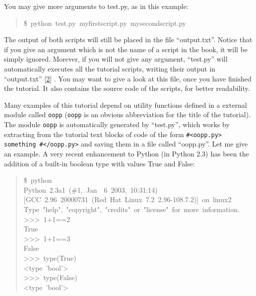\documentclass[10pt,english]{article}
\begin{document}
You may give more arguments to test.py, as in this example:
\begin{quote}
\begin{ttfamily}\begin{flushleft}
\mbox{{\$}~python~test.py~myfirstscript.py~mysecondscript.py}
\end{flushleft}\end{ttfamily}
\end{quote}

The output of both scripts will still be placed in the file ``output.txt''.
Notice that if you give an argument which is not the name of a script in the
book, it will be simply ignored. Morever, if you will not give any argument,
``test.py'' will automatically executes all the tutorial scripts, writing their 
output in ``output.txt'' [\hyperlink{id4}{2}] . You may want to give a look at this file, once 
you have finished the tutorial. It also contains the source code of 
the scripts, for better readability.

Many examples of this tutorial depend on utility functions defined
in a external module called \texttt{oopp} (\texttt{oopp} is an obvious abbreviation 
for the title of the tutorial). The module \texttt{oopp} is automatically generated 
by ``test.py'', which works by extracting from the tutorial 
text blocks of code of the form \texttt{{\#}<oopp.py> something {\#}</oopp.py>} 
and saving them in a file called ``oopp.py''. 
Let me give an example. A very recent enhancement to Python (in 
Python 2.3) has been the addition of a built-in boolean type with
values True and False:
\begin{quote}
\begin{ttfamily}\begin{flushleft}
\mbox{{\$}~python}\\
\mbox{Python~2.3a1~({\#}1,~Jan~~6~2003,~10:31:14)}\\
\mbox{[GCC~2.96~20000731~(Red~Hat~Linux~7.2~2.96-108.7.2)]~on~linux2}\\
\mbox{Type~"help",~"copyright",~"credits"~or~"license"~for~more~information.}\\
\mbox{>>>~1+1==2}\\
\mbox{True}\\
\mbox{>>>~1+1==3}\\
\mbox{False}\\
\mbox{>>>~type(True)}\\
\mbox{<type~'bool'>}\\
\mbox{>>>~type(False)}\\
\mbox{<type~'bool'>}
\end{flushleft}\end{ttfamily}
\end{quote}
\end{document}
